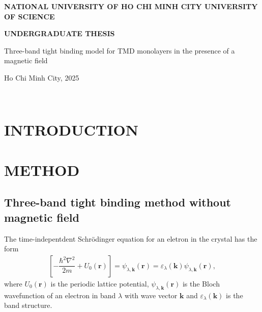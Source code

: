 \documentclass{report}
\newcommand{\f}[2]{\dfrac{#1}{#2}}
\newcommand{\thesistitlee}{Three-band tight binding model for TMD monolayers in the presence of a magnetic field}
\newcommand{\address}{NATIONAL UNIVERSITY OF HO CHI MINH CITY UNIVERSITY OF SCIENCE}
\newcommand{\graddate}{Ho Chi Minh City, 2025}
\begin{document}
\setlength{\parindent}{20pt}
\begin{center}
	{\bfseries

		{\large {\bf \address}}\\
		\vspace{2.5cm}

		{\large {\bf UNDERGRADUATE THESIS}}\\
		\vspace{3.0cm}


		{\largerrr\thesistitlee}
		\vspace{1in}

		{\large\graddate}
	}

\end{center}
\noindent
\makebox[\textwidth]{\hfill\makebox[3in]{\hrulefill}}\\
\begin{center}
\end{center}
\newpage
\pagestyle{fancy}
\renewcommand{\headrulewidth}{0pt}
\fancyhf{}
\fancyfoot[C]{\hspace{0cm} \thepage}
\setcounter{page}{1}
\renewcommand{\contentsname}{TABLE OF CONTENTS}
\tableofcontents
\renewcommand{\listfigurename}{LIST OF FIGURES}
\listoffigures
\chapter{\textbf{INTRODUCTION}}
\chapter{\textbf{METHOD}}
\section{Three-band tight binding method without magnetic field}
The time-indepentdent Schr\"{o}dinger equation for an eletron in the crystal has the form
\begin{gather}
	\left[-\f{\hbar^{2} \nabla^{2}}{2m} + U_{0}(\mathbf{r})\right] = \psi_{\lambda,\mathbf{k}}(\mathbf{r}) = \varepsilon_{\lambda}(\mathbf{k}) \psi_{\lambda,\mathbf{k}}(\mathbf{r}),
\end{gather}
where $U_{0}(\mathbf{r})$ is the periodic lattice potential, $\psi_{\lambda,\mathbf{k}}(\mathbf{r})$ is the Bloch wavefunction of an electron in band $\lambda$ with wave vector $\mathbf{k}$ and $\varepsilon_{\lambda}(\mathbf{k})$ is the band structure.
\end{document}
